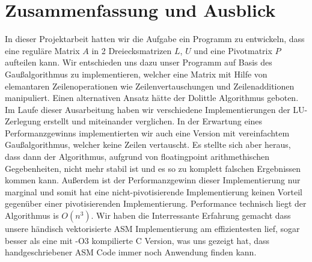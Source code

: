 \documentclass[course=erap]{aspdoc}
\begin{document}
\section{Zusammenfassung und Ausblick}
In dieser Projektarbeit hatten wir die Aufgabe ein Programm zu entwickeln, dass eine reguläre Matrix $A$ in 2 Dreiecksmatrizen
$L$, $U$ und eine Pivotmatrix $P$ aufteilen kann. Wir entschieden uns dazu unser Programm auf Basis des Gaußalgorithmus 
zu implementieren, welcher eine Matrix mit Hilfe von elemantaren Zeilenoperationen wie Zeilenvertauschungen und 
Zeilenadditionen manipuliert. Einen alternativen Ansatz hätte der Dolittle Algorithmus geboten. Im Laufe dieser Ausarbeitung 
haben wir verschiedene Implementierungen der LU-Zerlegung erstellt und miteinander verglichen. In der Erwartung eines 
Performanzgewinns implementierten wir auch eine Version mit vereinfachtem Gaußalgorithmus, welcher keine Zeilen vertauscht. 
Es stellte sich aber heraus, dass dann der Algorithmus, aufgrund von floatingpoint arithmethischen Gegebenheiten, nicht 
mehr stabil ist und es so zu komplett falschen Ergebnissen kommen kann. Außerdem ist der Performanzgewinn dieser Implementierung nur marginal und somit hat eine 
nicht-pivotisierende Implementierung keinen Vorteil gegenüber einer pivotisierenden Implementierung. Performance technisch 
liegt der Algorithmus is $O(n^3)$. Wir haben die Interressante Erfahrung gemacht dass unsere händisch vektorisierte ASM 
Implementierung am effizientesten lief, sogar besser als eine mit -O3 kompilierte C Version, was uns gezeigt hat, 
dass handgeschriebener ASM Code immer noch Anwendung finden kann. 


{}
\end{document}
